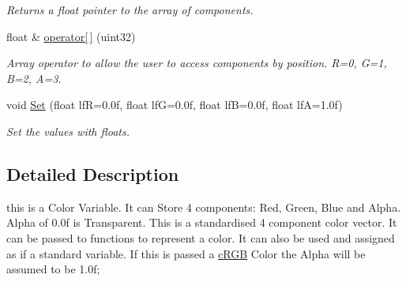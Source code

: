 \begin{DoxyCompactItemize}
\begin{DoxyCompactList}\small\item\em Returns a float pointer to the array of components. \end{DoxyCompactList}\item 
\hypertarget{classc_r_g_b_a_aa6b05808b1fa55cb21cbcb6fba301580}{
float \& \hyperlink{classc_r_g_b_a_aa6b05808b1fa55cb21cbcb6fba301580}{operator\mbox{[}$\,$\mbox{]}} (uint32)}
\label{classc_r_g_b_a_aa6b05808b1fa55cb21cbcb6fba301580}

\begin{DoxyCompactList}\small\item\em Array operator to allow the user to access components by position. R=0, G=1, B=2, A=3. \end{DoxyCompactList}\item 
\hypertarget{classc_r_g_b_a_a22087ddfe6b9ae99617cbe5090d5439e}{
void \hyperlink{classc_r_g_b_a_a22087ddfe6b9ae99617cbe5090d5439e}{Set} (float lfR=0.0f, float lfG=0.0f, float lfB=0.0f, float lfA=1.0f)}
\label{classc_r_g_b_a_a22087ddfe6b9ae99617cbe5090d5439e}

\begin{DoxyCompactList}\small\item\em Set the values with floats. \end{DoxyCompactList}\end{DoxyCompactItemize}


\subsection{Detailed Description}
this is a Color Variable. It can Store 4 components: Red, Green, Blue and Alpha. Alpha of 0.0f is Transparent. This is a standardised 4 component color vector. It can be passed to functions to represent a color. It can also be used and assigned as if a standard variable. If this is passed a \hyperlink{classc_r_g_b}{cRGB} Color the Alpha will be assumed to be 1.0f; 